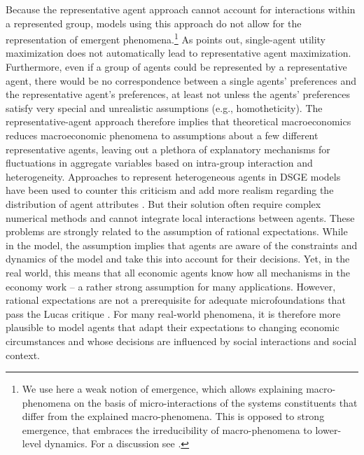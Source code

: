 Because the representative agent approach cannot account for interactions within a represented group, models using this approach do not allow for the representation of emergent phenomena.\footnote{We use here a weak notion of emergence, which allows explaining macro-phenomena on the basis of micro-interactions of the systems constituents that differ from the explained macro-phenomena. This is opposed to strong emergence, that embraces the irreducibility of macro-phenomena to lower-level dynamics. For a discussion see \citet{Bedau1997}.}
As \citet{Kirman1992} points out, single-agent utility maximization does not automatically lead to representative agent maximization.
Furthermore, even if a group of agents could be represented by a representative agent, there would be no correspondence between a single agents' preferences and the representative agent's preferences, at least not unless the agents' preferences satisfy very special and unrealistic assumptions (e.g., homotheticity).
The representative-agent approach therefore implies that theoretical macroeconomics reduces macroeconomic phenomena to assumptions about a few different representative agents, leaving out a plethora of explanatory mechanisms for fluctuations in aggregate variables based on intra-group interaction and heterogeneity.
Approaches to represent heterogeneous agents in DSGE models have been used to counter this criticism and add more realism regarding the distribution of agent attributes \citep[see, e.g., the review in ref.][]{Heathcote2009}.
But their solution often require complex numerical methods and cannot integrate local interactions between agents.
These problems are strongly related to the assumption of rational expectations.
While in the model, the assumption implies that agents are aware of the constraints and dynamics of the model and take this into account for their decisions. Yet, in the real world, this means that all economic agents know how all mechanisms in the economy work -- a rather strong assumption for many applications.
However, rational expectations are not a prerequisite for adequate microfoundations that pass the Lucas critique \citep{Evans2006}.
For many real-world phenomena, it is therefore more plausible to model agents that adapt their expectations to changing economic circumstances and whose decisions are influenced by social interactions and social context.

